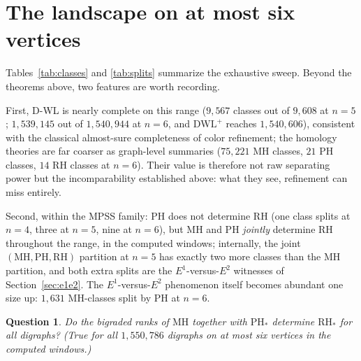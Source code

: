 \documentclass[pdflatex,sn-mathphys,Numbered]{sn-jnl}
\theoremstyle{thmstyleone}
\newtheorem{question}[theorem]{Question}
\theoremstyle{thmstyletwo}
\newcommand{\MH}{\mathrm{MH}}
\newcommand{\PH}{\mathrm{PH}}
\newcommand{\RH}{\mathrm{RH}}
\newcommand{\dwlp}{\mathrm{DWL}^{+}}
\begin{document}
\section{The landscape on at most six vertices}\label{sec:landscape}

\begin{table}[t]
\centering
\caption{Number of equivalence classes induced on the isomorphism classes
of digraphs by each invariant (machine-generated). ``dist'' is the
multiset of ordered directed distances; ``all three'' is the joint
$(\MH_{k\le3}, \PH_{\le 2}, \RH_{\le 3})$ class.}
\label{tab:classes}
\tabclasscounts
\end{table}

\begin{table}[t]
\centering
\caption{Refinement failures: number of equivalence classes of the first
invariant that split into two or more classes of the second
(machine-generated). A zero row is an exhaustive determination statement
for that $n$ and those windows.}
\label{tab:splits}
\tabsplits
\end{table}

Tables~\ref{tab:classes} and \ref{tab:splits} summarize the exhaustive
sweep. Beyond the theorems above, two features are worth recording.

First, D-WL is nearly complete on this range ($9{,}567$ classes out of
$9{,}608$ at $n = 5$; $1{,}539{,}145$ out of $1{,}540{,}944$ at
$n = 6$, and $\dwlp$ reaches $1{,}540{,}606$), consistent with the
classical almost-sure completeness of color refinement; the homology
theories are far coarser as graph-level summaries ($75{,}221$ $\MH$
classes, $21$ $\PH$ classes, $14$ $\RH$ classes at $n = 6$). Their
value is therefore not raw separating power but the incomparability
established above: what they see, refinement can miss entirely.

Second, within the MPSS family: $\PH$ does not determine $\RH$ (one
class splits at $n = 4$, three at $n = 5$, nine at $n = 6$), but $\MH$
and $\PH$ \emph{jointly} determine $\RH$ throughout the range, in the
computed windows; internally, the joint $(\MH, \PH, \RH)$ partition at
$n = 5$ has exactly two more classes than the $\MH$ partition, and both
extra splits are the $E^1$-versus-$E^2$ witnesses of
Section~\ref{sec:e1e2}. The $E^1$-versus-$E^2$ phenomenon itself
becomes abundant one size up: $1{,}631$ $\MH$-classes split by $\PH$ at
$n = 6$.

\begin{question}\label{q:mhphrh}
Do the bigraded ranks of $\MH$ together with $\PH_\ast$ determine
$\RH_\ast$ for all digraphs? (True for all $1{,}550{,}786$ digraphs on
at most six vertices in the computed windows.)
\end{question}
\end{document}

